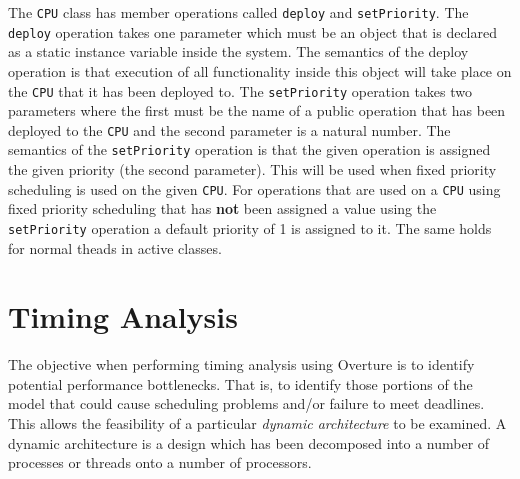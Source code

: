 \documentclass{overturerepchap}
\begin{document}
The \texttt{CPU} class has member operations called \texttt{deploy} and
\texttt{setPriority}. The \texttt{deploy} operation takes one parameter
which must be an object that is declared as a static instance variable
inside the system. The semantics of the deploy operation is that execution
of all functionality inside this object will take place on the 
\texttt{CPU} that it
has been deployed to. The \texttt{setPriority} operation takes two 
parameters where the first must be the name of a public operation that 
has been deployed to the \texttt{CPU}
 and the second parameter is a natural number.
The semantics of the \texttt{setPriority} operation is that the given 
operation is assigned the given priority (the second parameter). This will
be used when fixed priority scheduling is used on the given
\texttt{CPU}. For operations that are used on a \texttt{CPU} using
fixed priority scheduling that has \textbf{not} been assigned a value
using the \texttt{setPriority} operation a default priority of 1 is
assigned to it. The same holds for normal theads in active classes.

\section{Timing Analysis}\label{sec:timingintro}

The objective when performing timing analysis using Overture is to
identify potential performance bottlenecks. That is, to identify
those portions of the model that could cause scheduling problems
and/or failure to meet deadlines. This allows the feasibility of a
particular \emph{dynamic architecture} to be examined. A dynamic
architecture is a design which has been decomposed into a number of
processes or threads onto a number of processors.

\end{document}
